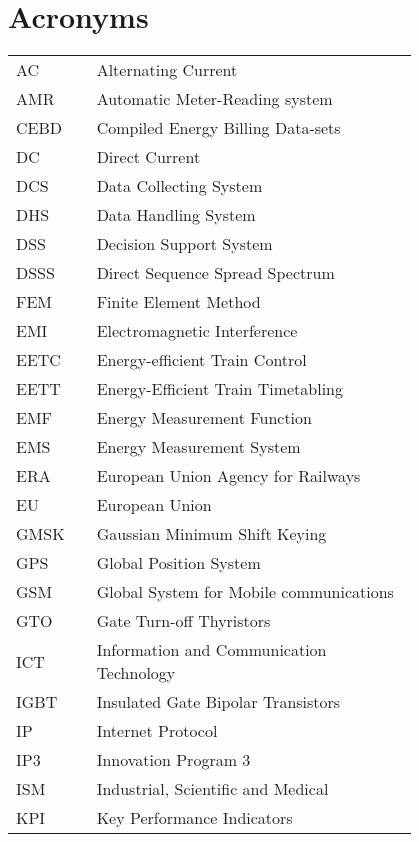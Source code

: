\chapter*{Acronyms}

{
	\footnotesize
\begin{flushleft}
	\begin{tabular}{l p{0.8\linewidth}}
		
		\\
		
		AC	&	Alternating Current	\\
		AMR	&	Automatic Meter-Reading system	\\
		CEBD	&	Compiled Energy Billing Data-sets	\\
		DC	&	Direct Current	\\
		DCS	&	Data Collecting System	\\
		DHS	&	Data Handling System	\\
		DSS	&	Decision Support System	\\
		DSSS	&	Direct Sequence Spread Spectrum	\\
		FEM	&	Finite Element Method	\\
		EMI	&	Electromagnetic Interference	\\
		EETC	&	Energy-efficient Train Control	\\
		EETT	&	Energy-Efficient Train Timetabling	\\
		EMF	&	Energy Measurement Function	\\
		EMS	&	Energy Measurement System	\\
		ERA	&	European Union Agency for Railways	\\
		EU	&	European Union	\\
		GMSK	&	Gaussian Minimum Shift Keying	\\
		GPS	&	Global Position System	\\
		GSM	&	Global System for Mobile communications	\\
		GTO	&	Gate Turn-off Thyristors	\\
		ICT	&	Information and Communication Technology	\\
		IGBT	&	Insulated Gate Bipolar Transistors	\\
		IP	&	Internet Protocol	\\
		IP3	&	Innovation Program 3	\\
		ISM	&	Industrial, Scientific and Medical	\\
		KPI	&	Key Performance Indicators	\\

\end{tabular}
\end{flushleft}}
